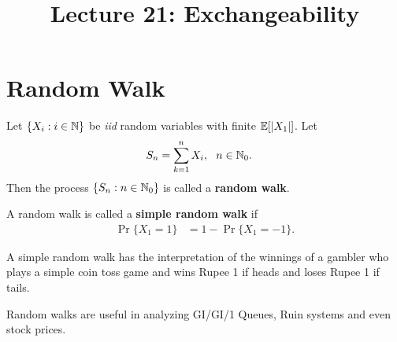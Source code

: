 \documentclass[a4paper,10pt,english]{article}
\title{Lecture 21: Exchangeability}
\author{}
\begin{document}
\maketitle
\section{Random Walk}
\begin{defn} Let $\{X_i: i \in \mathbb{N}\}$ be \textit{iid} random variables with finite $\mathbb{E}[|X_1|]$. Let
\begin{align*}
S_n &= \sum_{k=1}^n X_i, ~~n \in \mathbb{N}_0.
\end{align*}
Then the process $\{S_n: n \in \mathbb{N}_0\}$ is called a \textbf{random walk}. 
\end{defn}
\begin{defn} A random walk is called a \textbf{simple random walk} if
\begin{align*}
\Pr\{X_1 = 1\} &= 1- \Pr\{X_1 = -1\}.
\end{align*}
\end{defn}
\begin{rem} A simple random walk has the interpretation of the winnings of a gambler who plays a simple coin toss game and wins Rupee 1 if heads and loses Rupee 1 if tails. 
\end{rem}
\begin{rem} Random walks are useful in analyzing GI/GI/1 Queues, Ruin systems and even stock prices.
\end{rem}
\end{document}
